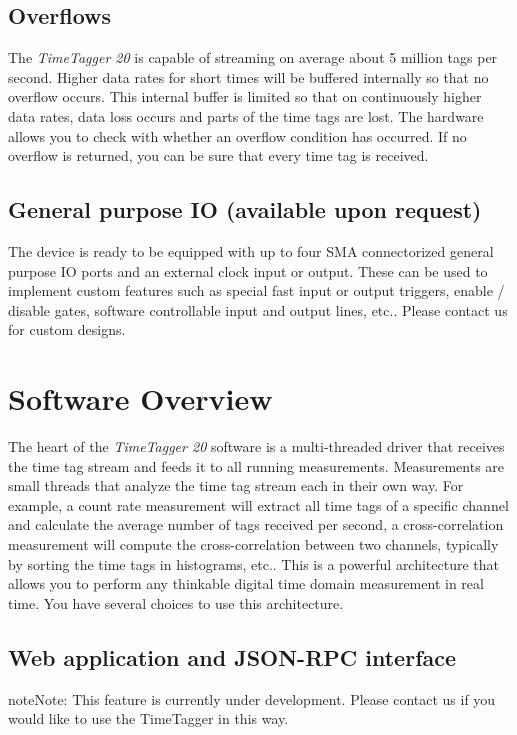 \documentclass[letterpaper,10pt,english]{sphinxmanual}
\begin{document}
\section{Overflows}
\label{sections/hardware:overflows}
The \emph{TimeTagger 20} is capable of streaming on average about 5 million tags per second.
Higher data rates for short times will be buffered internally so that no overflow occurs.
This internal buffer is limited so that on continuously higher data rates, data loss occurs and parts of the time tags are lost. The hardware allows you
to check with  whether an overflow condition has occurred. If no overflow is returned, you can be sure that every time tag is received.


\section{General purpose IO (available upon request)}
\label{sections/hardware:general-purpose-io-available-upon-request}
The device is ready to be equipped with up to four SMA connectorized general purpose IO ports and an external clock input or output.
These can be used to implement custom features such as special fast input or output triggers, enable / disable gates,
software controllable input and output lines, etc.. Please contact us for custom designs.


\chapter{Software Overview}
\label{sections/software:software-overview}\label{sections/software::doc}
The heart of the \emph{TimeTagger 20} software is a multi-threaded driver
that receives the time tag stream and feeds it to all running
measurements. Measurements are small threads that analyze the time tag stream
each in their own way. For example, a count rate measurement will extract all time
tags of a specific channel and calculate the average number of tags received per
second, a cross-correlation measurement will compute the cross-correlation between two
channels, typically by sorting the time tags in histograms, etc.. This is a
powerful architecture that allows you to perform any thinkable digital time domain
measurement in real time. You have several choices to use this architecture.


\section{Web application and JSON-RPC interface}
\label{sections/software:web-application-and-json-rpc-interface}
\begin{notice}{note}{Note:}
This feature is currently under development. Please contact us if you would like to use the TimeTagger in this way.
\end{notice}
\end{document}
